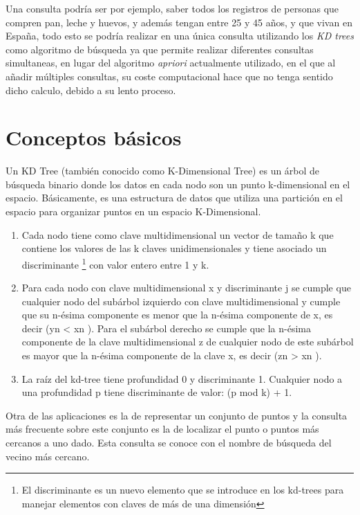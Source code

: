 \documentclass{cosas/tfg_domingo}
\begin{document}
\hspace{0.5mm}

Una consulta podría ser por ejemplo, saber todos los registros de personas que compren pan, leche y huevos, y además tengan entre 25 y 45 años, y que vivan en España, todo esto se podría realizar en una única consulta utilizando los \textit{KD trees} como algoritmo de búsqueda ya que permite realizar diferentes consultas simultaneas, en lugar del algoritmo \textit{apriori} actualmente utilizado, en el que al añadir múltiples consultas, su coste computacional hace que no tenga sentido dicho calculo, debido a su lento proceso.

\section{Conceptos básicos}

Un KD Tree (también conocido como K-Dimensional Tree) es un árbol de búsqueda binario donde los datos en cada nodo son un punto k-dimensional en el espacio. Básicamente, es una estructura de datos que utiliza una partición en el espacio para organizar puntos en un espacio K-Dimensional.

\begin{enumerate}
    \item Cada nodo tiene como clave multidimensional un vector de tamaño k
que contiene los valores de las k claves unidimensionales y tiene asociado un discriminante \footnote{El discriminante es un nuevo elemento que se introduce en los kd-trees para manejar elementos con claves de más de una dimensión} con valor entero entre 1 y k.
    \item Para cada nodo con clave multidimensional x y discriminante j se
cumple que cualquier nodo del subárbol izquierdo con clave multidimensional y cumple que su n-ésima componente es menor que la n-ésima componente de x, es decir (yn < xn ). Para el subárbol derecho se cumple que la n-ésima componente de la clave multidimensional z de cualquier nodo de este subárbol es mayor que la n-ésima componente de la clave x, es decir (zn > xn ).
    \item La raíz del kd-tree tiene profundidad 0 y discriminante 1. Cualquier
nodo a una profundidad p tiene discriminante de valor: (p mod k) + 1.
\citet{bentley1975multidimensional}
\end{enumerate}

Otra de las aplicaciones es la de representar un conjunto de puntos y la consulta más frecuente sobre este conjunto es la de localizar el punto o puntos más cercanos a uno dado. Esta consulta se conoce con el nombre de búsqueda del vecino más cercano.
\end{document}
